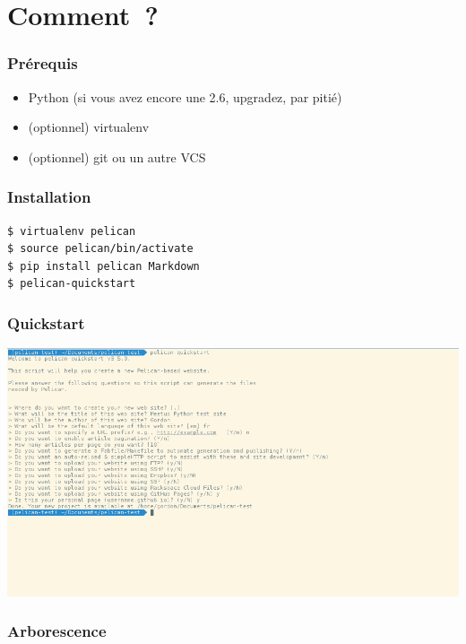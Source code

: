 \documentclass[frenchb,francais]{beamer}
\begin{document}
\section{Comment ?}

\begin{frame}
    \frametitle{Prérequis}
    \begin{itemize}
        \item Python (si vous avez encore une 2.6, upgradez, par pitié)
        \item (optionnel) virtualenv
        \item (optionnel) git ou un autre VCS
    \end{itemize}
\end{frame}

\begin{frame}[containsverbatim]
    \frametitle{Installation}
    \lstset{language=bash}
    \begin{lstlisting}
$ virtualenv pelican
$ source pelican/bin/activate
$ pip install pelican Markdown
$ pelican-quickstart
    \end{lstlisting}
\end{frame}

\begin{frame}
    \frametitle{Quickstart}
    \begin{center}\includegraphics[scale=.30]{img/quickstart.png}\end{center}
\end{frame}

\begin{frame}[containsverbatim]
    \frametitle{Arborescence}
\end{frame}
\end{document}

